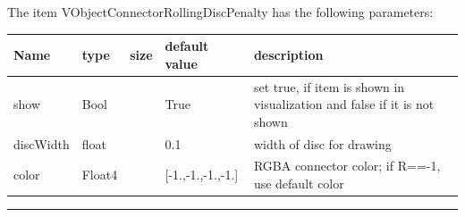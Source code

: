 The item VObjectConnectorRollingDiscPenalty has the following parameters:\vspace{-1cm}\\ 
\begin{center}
  \footnotesize
  \begin{longtable}{| p{4.5cm} | p{2.5cm} | p{0.5cm} | p{2.5cm} | p{6cm} |}
    \hline
    \bf Name & \bf type & \bf size & \bf default value & \bf description \\ \hline
    show &     Bool &      &     True &     set true, if item is shown in visualization and false if it is not shown\\ \hline
    discWidth &     float &      &     0.1 &     width of disc for drawing\\ \hline
    color &     Float4 &      &     [-1.,-1.,-1.,-1.] &     RGBA connector color; if R==-1, use default color\\ \hline
	  \end{longtable}
	\end{center}
\par\noindent\rule{\textwidth}{0.4pt}
\label{description_ObjectConnectorRollingDiscPenalty}
